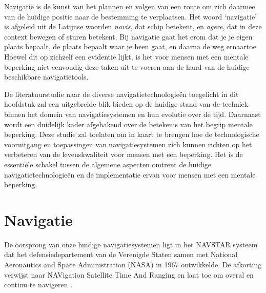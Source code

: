 


Navigatie is de kunst van het plannen en volgen van een route om zich daarmee van de huidige positie naar de bestemming te verplaatsen. Het woord `navigatie' is afgeleid uit de Latijnse woorden \textit{navis}, dat schip betekent, en \textit{agere}, dat in deze context bewegen of sturen betekent. Bij navigatie gaat het erom dat je je eigen plaats bepaalt, de plaats bepaalt waar je heen gaat, en daarna de weg ernaartoe. Hoewel dit op zichzelf een evidentie lijkt, is het voor mensen met een mentale beperking niet eenvoudig deze taken uit te voeren aan de hand van de huidige beschikbare navigatietools.

De literatuurstudie naar de diverse navigatietechnologieën toegelicht in dit hoofdstuk zal een uitgebreide blik bieden op de huidige stand van de techniek binnen het domein van navigatiesystemen en hun evolutie over de tijd. Daarnaast wordt een duidelijk kader afgebakend over de betekenis van het begrip mentale beperking. Deze studie zal toelaten om in kaart te brengen hoe de technologische vooruitgang en toepassingen van navigatiesystemen zich kunnen richten op het verbeteren van de levenskwaliteit voor mensen met een beperking. Het is de essentiële schakel tussen de algemene aspecten omtrent de huidige navigatietechnologieën en de implementatie ervan voor mensen met een mentale beperking.

\section{Navigatie}
\label{sec:navigatie}

De oorsprong van onze huidige navigatiesystemen ligt in het NAVSTAR systeem dat het defensiedepartement van de Verenigde Staten samen met National Aeronautics and Space Administration (NASA) in 1967 ontwikkelde. De afkorting verwijst naar NAVigation Satellite Time And Ranging en laat toe om overal en continu te navigeren \autocite{Bowditch2002}. 

